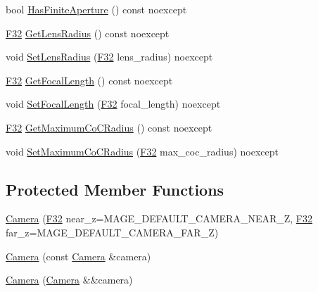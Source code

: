 \begin{DoxyCompactItemize}
\item 
bool \hyperlink{classmage_1_1_camera_a414cfe9e97f0e42364056e78412fef1a}{Has\+Finite\+Aperture} () const noexcept
\item 
\hyperlink{namespacemage_aa97e833b45f06d60a0a9c4fc22ae02c0}{F32} \hyperlink{classmage_1_1_camera_a7c3890887fc155ab275321b962744e80}{Get\+Lens\+Radius} () const noexcept
\item 
void \hyperlink{classmage_1_1_camera_af507ae56708b3591c174af01295e4071}{Set\+Lens\+Radius} (\hyperlink{namespacemage_aa97e833b45f06d60a0a9c4fc22ae02c0}{F32} lens\+\_\+radius) noexcept
\item 
\hyperlink{namespacemage_aa97e833b45f06d60a0a9c4fc22ae02c0}{F32} \hyperlink{classmage_1_1_camera_a473908b18eb0d9d011eb789c9138fffb}{Get\+Focal\+Length} () const noexcept
\item 
void \hyperlink{classmage_1_1_camera_a3c4e2c6a00c11ae0f0fd404d3d4f511b}{Set\+Focal\+Length} (\hyperlink{namespacemage_aa97e833b45f06d60a0a9c4fc22ae02c0}{F32} focal\+\_\+length) noexcept
\item 
\hyperlink{namespacemage_aa97e833b45f06d60a0a9c4fc22ae02c0}{F32} \hyperlink{classmage_1_1_camera_a92714d8092aa5230771b8f3452f6f969}{Get\+Maximum\+Co\+C\+Radius} () const noexcept
\item 
void \hyperlink{classmage_1_1_camera_a586912018439ff0cbd6ed2d6d9554db4}{Set\+Maximum\+Co\+C\+Radius} (\hyperlink{namespacemage_aa97e833b45f06d60a0a9c4fc22ae02c0}{F32} max\+\_\+coc\+\_\+radius) noexcept
\end{DoxyCompactItemize}
\subsection*{Protected Member Functions}
\begin{DoxyCompactItemize}
\item 
\hyperlink{classmage_1_1_camera_adb5cd01b5d55527b919fb3920d8be7e8}{Camera} (\hyperlink{namespacemage_aa97e833b45f06d60a0a9c4fc22ae02c0}{F32} near\+\_\+z=M\+A\+G\+E\+\_\+\+D\+E\+F\+A\+U\+L\+T\+\_\+\+C\+A\+M\+E\+R\+A\+\_\+\+N\+E\+A\+R\+\_\+Z, \hyperlink{namespacemage_aa97e833b45f06d60a0a9c4fc22ae02c0}{F32} far\+\_\+z=M\+A\+G\+E\+\_\+\+D\+E\+F\+A\+U\+L\+T\+\_\+\+C\+A\+M\+E\+R\+A\+\_\+\+F\+A\+R\+\_\+Z)
\item 
\hyperlink{classmage_1_1_camera_a28d9280bd7067ec4d28392558cc2b767}{Camera} (const \hyperlink{classmage_1_1_camera}{Camera} \&camera)
\item 
\hyperlink{classmage_1_1_camera_a4dc6f31c108b28abe9580ef6d7a06713}{Camera} (\hyperlink{classmage_1_1_camera}{Camera} \&\&camera)
\end{DoxyCompactItemize}
